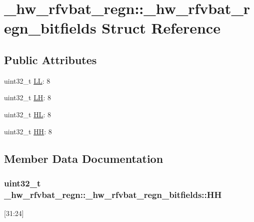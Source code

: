 \hypertarget{struct__hw__rfvbat__regn_1_1__hw__rfvbat__regn__bitfields}{}\section{\+\_\+hw\+\_\+rfvbat\+\_\+regn\+:\+:\+\_\+hw\+\_\+rfvbat\+\_\+regn\+\_\+bitfields Struct Reference}
\label{struct__hw__rfvbat__regn_1_1__hw__rfvbat__regn__bitfields}
\subsection*{Public Attributes}
\begin{DoxyCompactItemize}
\item 
uint32\+\_\+t \hyperlink{struct__hw__rfvbat__regn_1_1__hw__rfvbat__regn__bitfields_a163a34db2c48e121720e5a72a2774b07}{LL}\+: 8
\item 
uint32\+\_\+t \hyperlink{struct__hw__rfvbat__regn_1_1__hw__rfvbat__regn__bitfields_ae39cb9b6d069568c933467fa858f9fcf}{LH}\+: 8
\item 
uint32\+\_\+t \hyperlink{struct__hw__rfvbat__regn_1_1__hw__rfvbat__regn__bitfields_a3d9aeeb7dd08466eca30ade9019accff}{HL}\+: 8
\item 
uint32\+\_\+t \hyperlink{struct__hw__rfvbat__regn_1_1__hw__rfvbat__regn__bitfields_a193da55e41dfe0909efe2bb814316cc3}{HH}\+: 8
\end{DoxyCompactItemize}


\subsection{Member Data Documentation}
\subsubsection[{\texorpdfstring{HH}{HH}}]{\setlength{\rightskip}{0pt plus 5cm}uint32\+\_\+t \+\_\+hw\+\_\+rfvbat\+\_\+regn\+::\+\_\+hw\+\_\+rfvbat\+\_\+regn\+\_\+bitfields\+::\+HH}\hypertarget{struct__hw__rfvbat__regn_1_1__hw__rfvbat__regn__bitfields_a193da55e41dfe0909efe2bb814316cc3}{}\label{struct__hw__rfvbat__regn_1_1__hw__rfvbat__regn__bitfields_a193da55e41dfe0909efe2bb814316cc3}
\mbox{[}31\+:24\mbox{]} 
